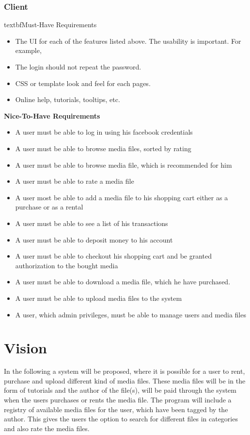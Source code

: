 \subsubsection{Client}
textbf{Must-Have Requirements}
\begin{itemize}
	\item The UI for each of the features listed above. The usability is important. For example,
	\item The login should not repeat the password.
	\item CSS or template look and feel for each pages.
	\item Online help, tutorials, tooltips, etc.
\end{itemize}
\textbf{Nice-To-Have Requirements}
\begin{itemize}
	\item A user must be able to log in using his facebook credentials
	\item A user must be able to browse media files, sorted by rating
	\item A user must be able to browse media file, which is recommended for him
	\item A user must be able to rate a media file
	\item A user most be able to add a media file to his shopping cart either as a purchase or as a rental
	\item A user must be able to see a list of his transactions
	\item A user must be able to deposit money to his account
	\item A user must be able to checkout his shopping cart and be granted authorization to the bought media
	\item A user must be able to download a media file, which he have purchased. 
	\item A user must be able to upload media files to the system
	\item A user, which admin privileges, must be able to manage users and media files 
\end{itemize}


\section{Vision}
In the following a system will be proposed, where it is possible for a user to rent, purchase and upload different kind of media files. These media files will be in the form of tutorials and the author of the file(s), will be paid through the system when the users purchases or rents the media file. The program will include a registry of available media files for the user, which have been tagged by the author. This gives the users the option to search for different files in categories and also rate the media files.\\

